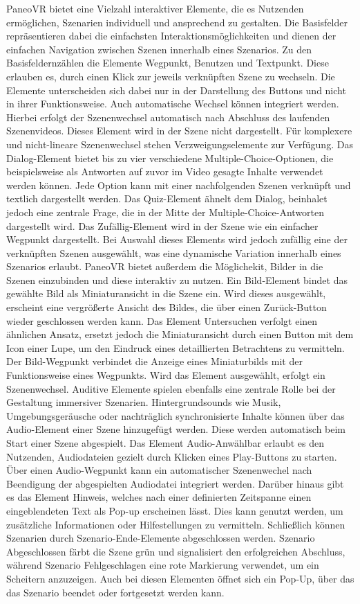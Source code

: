 PaneoVR bietet eine Vielzahl interaktiver Elemente, die es Nutzenden ermöglichen, Szenarien individuell und ansprechend zu gestalten. Die Basisfelder repräsentieren dabei die einfachsten Interaktionsmöglichkeiten und dienen der einfachen Navigation zwischen Szenen innerhalb eines Szenarios. Zu den Basisfeldernzählen die Elemente Wegpunkt, Benutzen und Textpunkt. Diese erlauben es, durch einen Klick zur jeweils verknüpften Szene zu wechseln. Die Elemente unterscheiden sich dabei nur in der Darstellung des Buttons und nicht in ihrer Funktionsweise. Auch automatische Wechsel können integriert werden. Hierbei erfolgt der Szenenwechsel automatisch nach Abschluss des laufenden Szenenvideos. Dieses Element wird in der Szene nicht dargestellt. 
Für komplexere und nicht-lineare Szenenwechsel stehen Verzweigungselemente zur Verfügung. Das Dialog-Element bietet bis zu vier verschiedene Multiple-Choice-Optionen, die beispielsweise als Antworten auf zuvor im Video gesagte Inhalte verwendet werden können. Jede Option kann mit einer nachfolgenden Szenen verknüpft und textlich dargestellt werden. Das Quiz-Element ähnelt dem Dialog, beinhalet jedoch eine zentrale Frage, die in der Mitte der  Multiple-Choice-Antworten dargestellt wird. Das Zufällig-Element wird in der Szene wie ein einfacher Wegpunkt dargestellt. Bei Auswahl dieses Elements wird jedoch zufällig eine der verknüpften Szenen ausgewählt, was eine dynamische Variation innerhalb eines Szenarios erlaubt.
PaneoVR bietet außerdem die Möglichekit, Bilder in die Szenen einzubinden und diese interaktiv zu nutzen. Ein Bild-Element bindet das gewählte Bild als Miniaturansicht in die Szene ein. Wird dieses ausgewählt, erscheint eine vergrößerte Ansicht des Bildes, die über einen Zurück-Button wieder geschlossen werden kann. Das Element Untersuchen verfolgt einen ähnlichen Ansatz, ersetzt jedoch die Miniaturansicht durch einen Button mit dem Icon einer Lupe, um den Eindruck eines detaillierten Betrachtens zu vermitteln. Der Bild-Wegpunkt verbindet die Anzeige eines Miniaturbilds mit der Funktionsweise eines Wegpunkts. Wird das Element ausgewählt, erfolgt ein Szenenwechsel. 
Auditive Elemente spielen ebenfalls eine zentrale Rolle bei der Gestaltung immersiver Szenarien. Hintergrundsounds wie Musik, Umgebungsgeräusche oder nachträglich synchronisierte Inhalte können über das Audio-Element einer Szene hinzugefügt werden. Diese werden automatisch beim Start einer Szene abgespielt. Das Element Audio-Anwählbar erlaubt es den Nutzenden, Audiodateien gezielt durch Klicken eines Play-Buttons zu starten. Über einen Audio-Wegpunkt kann ein automatischer Szenenwechel nach Beendigung der abgespielten Audiodatei integriert werden. 
Darüber hinaus gibt es das Element Hinweis, welches nach einer definierten Zeitspanne einen eingeblendeten Text als Pop-up erscheinen lässt. Dies kann genutzt werden, um zusätzliche Informationen oder Hilfestellungen zu vermitteln. Schließlich können Szenarien durch Szenario-Ende-Elemente abgeschlossen werden. Szenario Abgeschlossen färbt die Szene grün und signalisiert den erfolgreichen Abschluss, während Szenario Fehlgeschlagen eine rote Markierung verwendet, um ein Scheitern anzuzeigen. Auch bei diesen Elementen öffnet sich ein Pop-Up, über das das Szenario beendet oder fortgesetzt werden kann.


